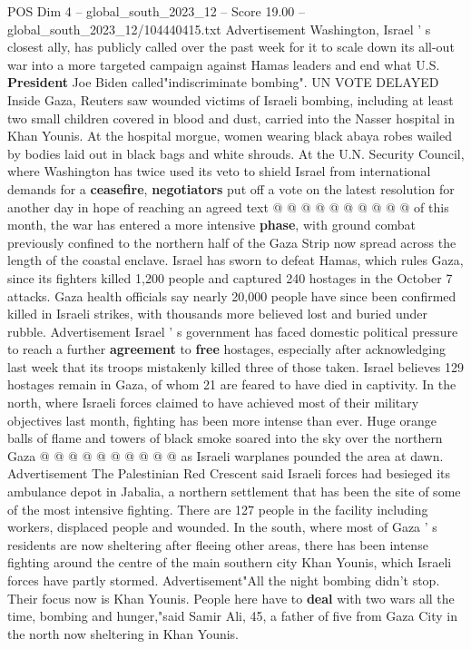 \begin{textsample}{POS Dim 4 – global\_south\_2023\_12 – Score 19.00 – global\_south\_2023\_12/104440415.txt}
Advertisement Washington, Israel ' s closest ally, has publicly called over the past week for it to scale down its all-out war into a more targeted campaign against Hamas leaders and end what U.S. \textbf{President} Joe Biden called"indiscriminate bombing".
UN VOTE DELAYED Inside Gaza, Reuters saw wounded victims of Israeli bombing, including at least two small children covered in blood and dust, carried into the Nasser hospital in Khan Younis.
At the hospital morgue, women wearing black abaya robes wailed by bodies laid out in black bags and white shrouds.
At the U.N.
Security Council, where Washington has twice used its veto to shield Israel from international demands for a \textbf{ceasefire}, \textbf{negotiators} put off a vote on the latest resolution for another day in hope of reaching an agreed text @ @ @ @ @ @ @ @ @ @ of this month, the war has entered a more intensive \textbf{phase}, with ground combat previously confined to the northern half of the Gaza Strip now spread across the length of the coastal enclave.
Israel has sworn to defeat Hamas, which rules Gaza, since its fighters killed 1,200 people and captured 240 hostages in the October 7 attacks.
Gaza health officials say nearly 20,000 people have since been confirmed killed in Israeli strikes, with thousands more believed lost and buried under rubble.
Advertisement Israel ' s government has faced domestic political pressure to reach a further \textbf{agreement} to \textbf{free} hostages, especially after acknowledging last week that its troops mistakenly killed three of those taken.
Israel believes 129 hostages remain in Gaza, of whom 21 are feared to have died in captivity.
In the north, where Israeli forces claimed to have achieved most of their military objectives last month, fighting has been more intense than ever.
Huge orange balls of flame and towers of black smoke soared into the sky over the northern Gaza @ @ @ @ @ @ @ @ @ @ as Israeli warplanes pounded the area at dawn.
Advertisement The Palestinian Red Crescent said Israeli forces had besieged its ambulance depot in Jabalia, a northern settlement that has been the site of some of the most intensive fighting.
There are 127 people in the facility including workers, displaced people and wounded.
In the south, where most of Gaza ' s residents are now sheltering after fleeing other areas, there has been intense fighting around the centre of the main southern city Khan Younis, which Israeli forces have partly stormed.
Advertisement"All the night bombing didn't stop.
Their focus now is Khan Younis.
People here have to \textbf{deal} with two wars all the time, bombing and hunger,"said Samir Ali, 45, a father of five from Gaza City in the north now sheltering in Khan Younis.

\end{textsample}
